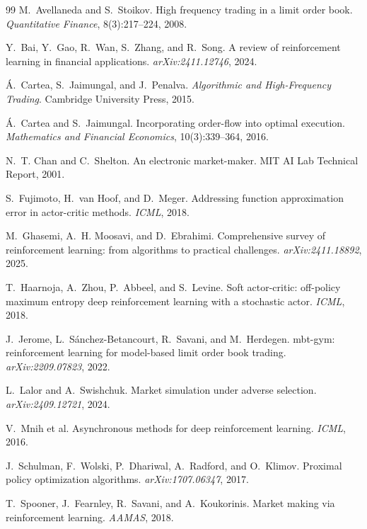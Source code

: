 \documentclass[10pt,twocolumn]{article}
\begin{document}
\begin{thebibliography}{99}
\small
{}
M.~Avellaneda and S.~Stoikov.
High frequency trading in a limit order book.
\emph{Quantitative Finance}, 8(3):217--224, 2008.

Y.~Bai, Y.~Gao, R.~Wan, S.~Zhang, and R.~Song.
A review of reinforcement learning in financial applications.
\emph{arXiv:2411.12746}, 2024.

{\'A}.~Cartea, S.~Jaimungal, and J.~Penalva.
\emph{Algorithmic and High-Frequency Trading}.
Cambridge University Press, 2015.

{\'A}.~Cartea and S.~Jaimungal.
Incorporating order-flow into optimal execution.
\emph{Mathematics and Financial Economics}, 10(3):339--364, 2016.

N.~T. Chan and C.~Shelton.
An electronic market-maker.
MIT AI Lab Technical Report, 2001.

S.~Fujimoto, H.~van Hoof, and D.~Meger.
Addressing function approximation error in actor-critic methods.
\emph{ICML}, 2018.

M.~Ghasemi, A.~H. Moosavi, and D.~Ebrahimi.
Comprehensive survey of reinforcement learning: from algorithms to practical challenges.
\emph{arXiv:2411.18892}, 2025.

T.~Haarnoja, A.~Zhou, P.~Abbeel, and S.~Levine.
Soft actor-critic: off-policy maximum entropy deep reinforcement learning with a stochastic actor.
\emph{ICML}, 2018.

J.~Jerome, L.~S{\'a}nchez-Betancourt, R.~Savani, and M.~Herdegen.
mbt-gym: reinforcement learning for model-based limit order book trading.
\emph{arXiv:2209.07823}, 2022.

L.~Lalor and A.~Swishchuk.
Market simulation under adverse selection.
\emph{arXiv:2409.12721}, 2024.

V.~Mnih et al.
Asynchronous methods for deep reinforcement learning.
\emph{ICML}, 2016.

J.~Schulman, F.~Wolski, P.~Dhariwal, A.~Radford, and O.~Klimov.
Proximal policy optimization algorithms.
\emph{arXiv:1707.06347}, 2017.

T.~Spooner, J.~Fearnley, R.~Savani, and A.~Koukorinis.
Market making via reinforcement learning.
\emph{AAMAS}, 2018.
\end{thebibliography}
\end{document}
